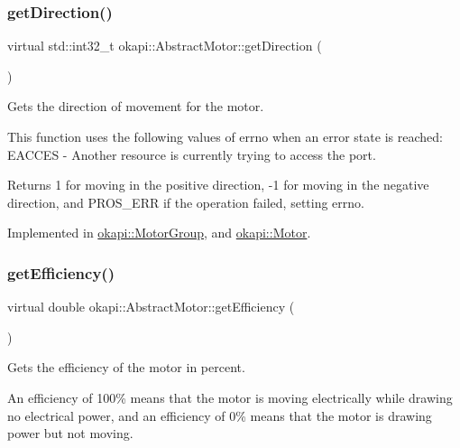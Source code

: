 \subsubsection{\texorpdfstring{getDirection()}{getDirection()}}
{\footnotesize\ttfamily virtual std\+::int32\+\_\+t okapi\+::\+Abstract\+Motor\+::get\+Direction (\begin{DoxyParamCaption}{ }\end{DoxyParamCaption})\hspace{0.3cm}{\ttfamily [pure virtual]}}

Gets the direction of movement for the motor.

This function uses the following values of errno when an error state is reached\+: E\+A\+C\+C\+ES -\/ Another resource is currently trying to access the port.

\begin{DoxyReturn}{Returns}
1 for moving in the positive direction, -\/1 for moving in the negative direction, and P\+R\+O\+S\+\_\+\+E\+RR if the operation failed, setting errno. 
\end{DoxyReturn}


Implemented in \mbox{\hyperlink{classokapi_1_1MotorGroup_a5466d52a245b10765945b91c0194da66}{okapi\+::\+Motor\+Group}}, and \mbox{\hyperlink{classokapi_1_1Motor_a72c69d60e2ec69c126c84dc81f78742d}{okapi\+::\+Motor}}.

\mbox{\label{classokapi_1_1AbstractMotor_a27a6e3ec007619a9b91f9d6ebc61e613}} 
\subsubsection{\texorpdfstring{getEfficiency()}{getEfficiency()}}
{\footnotesize\ttfamily virtual double okapi\+::\+Abstract\+Motor\+::get\+Efficiency (\begin{DoxyParamCaption}{ }\end{DoxyParamCaption})\hspace{0.3cm}{\ttfamily [pure virtual]}}

Gets the efficiency of the motor in percent.

An efficiency of 100\% means that the motor is moving electrically while drawing no electrical power, and an efficiency of 0\% means that the motor is drawing power but not moving.


